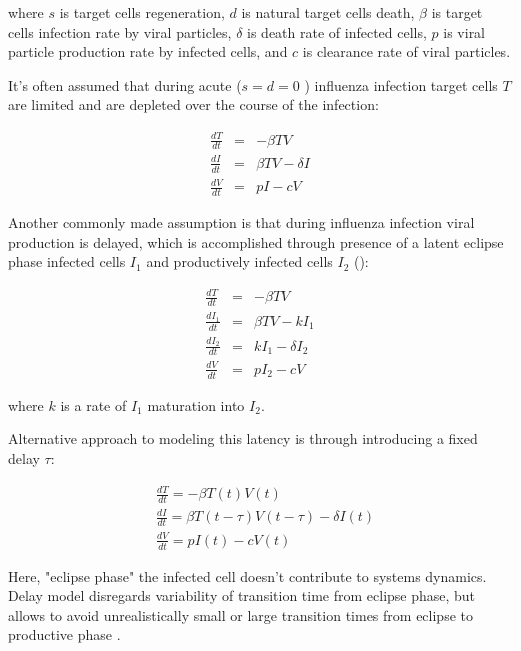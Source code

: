 where $s$ is target cells regeneration, $d$ is natural target cells death, $\beta$ is target cells infection rate by viral particles, $\delta$ is death rate of infected cells, $p$ is viral particle production rate by infected cells, and $c$ is clearance rate of viral particles.

It's often assumed that during acute ($s = d = 0$ \cite{baccam2006kinetics}) influenza infection target cells $T$ are limited and are depleted over the course of the infection:

\begin{equation}
\begin{array}{rcl}
\frac{dT}{dt} &=& - \beta T V \\
\frac{dI}{dt} &=& \beta T V - \delta I \\
\frac{dV}{dt} &=& p I - c V
\end{array}
\end{equation}

Another commonly made assumption is that during influenza infection viral production is delayed, which is accomplished through presence of a latent eclipse phase infected cells $I_1$ and productively infected cells $I_2$ (\cite{baccam2006kinetics}):

\begin{equation}
\begin{array}{rcl}
\frac{dT}{dt} &=& - \beta T V \\
\frac{dI_1}{dt} &=& \beta T V - k I_1 \\
\frac{dI_2}{dt} &=& k I_1 - \delta I_2 \\
\frac{dV}{dt} &=& p I_2 - c V
\end{array}
\end{equation}

where $k$ is a rate of $I_1$ maturation into $I_2$.

Alternative approach to modeling this latency is through introducing a fixed delay $\tau$:

\begin{equation}
\begin{array}{rcl}
&\frac{dT}{dt} = - \beta T(t) V(t) \\
&\frac{dI}{dt} = \beta T(t-\tau) V(t-\tau) - \delta I(t) \\
&\frac{dV}{dt} = p I(t) - c V(t)
\end{array}
\end{equation}

Here, "eclipse phase" the infected cell doesn't contribute to systems dynamics. Delay model disregards variability of transition time from eclipse phase, but allows to avoid unrealistically small or large transition times from eclipse to productive phase \cite{beauchemin2008modeling}.


